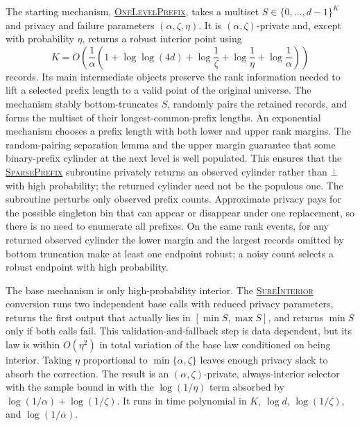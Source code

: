 \documentclass[11pt]{article}
\begin{document}
The starting mechanism,
\hyperref[alg:one-level-prefix]{\textsc{OneLevelPrefix}}, takes a multiset
$S\in\{0,\ldots,d-1\}^K$ and privacy and failure parameters
$(\alpha,\zeta,\eta)$.  It is $(\alpha,\zeta)$-private and, except with
probability $\eta$, returns a robust interior point using
\begin{equation}
 K=O\left(\frac1\alpha\left(
  1+\log\log(4d)+\log\frac1\zeta+\log\frac1\eta
    +\log\frac1\alpha\right)\right)
 \label{eq:overview-one-level-samples}
\end{equation}
records.  Its main intermediate objects preserve the rank information needed
to lift a selected prefix length to a valid point of the original universe.
The mechanism stably bottom-truncates $S$, randomly pairs the retained records, and forms
the multiset of their longest-common-prefix lengths.  An exponential
mechanism chooses a prefix length with both lower and upper rank margins.
The random-pairing separation lemma and the upper margin guarantee that some
binary-prefix cylinder at the next level is well populated.  This ensures
that the
\hyperref[alg:sparse-prefix]{\textsc{SparsePrefix}} subroutine privately
returns an observed cylinder rather than $\bot$ with high probability; the
returned cylinder need not be the populous one.  The subroutine perturbs only
observed prefix counts.  Approximate privacy pays for the possible singleton
bin that can appear or disappear under one replacement, so there is no need
to enumerate all prefixes.  On the same rank events, for any returned
observed cylinder the lower margin and the largest records omitted by bottom
truncation make at least one endpoint robust; a noisy count selects a robust
endpoint with high probability.

The base mechanism is only high-probability interior.  The
\hyperref[alg:sure-interior]{\textsc{SureInterior}} conversion runs two
independent base calls with reduced privacy parameters, returns the first
output that actually lies in $[\min S,\max S]$, and returns $\min S$ only if
both calls fail.  This validation-and-fallback step is data dependent, but
its law is within $O(\eta^2)$ in total variation of the base law conditioned
on being interior.  Taking $\eta$ proportional to
$\min\{\alpha,\zeta\}$ leaves enough privacy slack to absorb the correction.
The result is an $(\alpha,\zeta)$-private, always-interior selector with
the sample bound in  with the
$\log(1/\eta)$ term absorbed by
$\log(1/\alpha)+\log(1/\zeta)$.  It runs in time polynomial in $K$,
$\log d$, $\log(1/\zeta)$, and $\log(1/\alpha)$.
\end{document}
